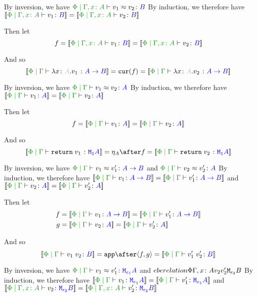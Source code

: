 \documentclass{report}
\begin{document}
    By inversion, we have $\eberelation{\P}{\gax}{v_1}{v_2}{B}$
    By induction, we therefore have $\deno{\etyperelation{\P}{\gax}{v_1}{B}} = \deno{\etyperelation{\P}{\gax}{v_2}{B}}$

    Then let
    \begin{equation}
        f = \deno{\etyperelation{\P}{\gax}{v_1}{B}} = \deno{\etyperelation{\P}{\gax}{v_2}{B}}
    \end{equation}

    And so
    \begin{equation}
        \deno{\gpetyperelation{\lam{x}{A}{v_1}}{\ab}} = \cur{f} = \deno{\gpetyperelation{\lam{x}{A}{v_2}}{\ab}}
    \end{equation}


By inversion, we have $\gpeberelation{v_1}{v_2}{A}$
By induction, we therefore have $\deno{\gpetyperelation{v_1}{A}} = \deno{\gpetyperelation{v_2}{A}}$

Then let
\begin{equation}
    f = \deno{\gpetyperelation{v_1}{A}} = \deno{\gpetyperelation{v_2}{A}}
\end{equation}

And so
\begin{equation}
    \deno{\gpetyperelation{\return{v_1}}{\M{\1}{A}}} = \point{A}\after f = \deno{\gpetyperelation{\return{v_2}}{\M{\1}{A}}}
\end{equation}


By inversion, we have $\gpeberelation{v_1}{v_1'}{\ab}$ and $\gpeberelation{v_2}{v_2'}{A}$
By induction, we therefore have $\deno{\gpetyperelation{v_1}{\ab}}= \deno{\gpetyperelation{v_1'}{\ab}}$ and $\deno{\gpetyperelation{v_2}{A}} = \deno{\gpetyperelation{v_2'}{A}}$

Then let
\begin{align*}
    f &{}= \deno{\gpetyperelation{v_1}{\ab}} = \deno{\gpetyperelation{v_1'}{\ab}}\\
    g &{}= \deno{\gpetyperelation{v_2}{A}} = \deno{\gpetyperelation{v_2'}{A}}
\end{align*}



And so
\begin{equation}
    \deno{\gpetyperelation{\apply{v_1}{v_2}}{B}} = \app\after\pr{f}{g} = \deno{\gpetyperelation{\apply{v_1'}{v_2'}}{B}}
\end{equation}


By inversion, we have $\gpeberelation{v_1}{v_1'}{\M{e_1}{A}}$ and $\\eberelation{\Phi}{\Gamma, x\colon A}{v_2}{v_2'}{\texttt{M}_{\epsilon_2}{B}}$
By induction, we therefore have $\deno{\gpetyperelation{v_1}{\M{e_1}{A}}}= \deno{\gpetyperelation{v_1'}{\M{e_1}{A}}}$ and $\deno{\etyperelation{\P}{\gax}{v_2}{\M{\e_2}{B}}} = \deno{\etyperelation{\P}{\gax}{v_2'}{\M{\e_2}{B}}}$
\end{document}
